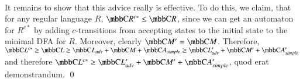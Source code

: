 \paragraph{}
It remains to show that this advice really is effective. To do this, we claim, that for any regular language $R$, $\C{R^{c*}} \leq \C{R}$, since we can get an automaton for $R^{c*}$ by adding $c$-transitions from accepting states to the initial state to the minimal DFA for $R$. Moreover, clearly $\C{M'} = \C{M}$. Therefore, $\C{L^{c*}} \geq \C{L} \geq \C{L_{adv}} + \C{M} + \C{A_{simple}} \geq \C{L'_{adv}} + \C{M'} + \C{A'_{simple}}$ and therefore $\C{L^{c*}} \geq \C{L'_{adv}} + \C{M'} + \C{A'_{simple}}$, quod erat demonstrandum. \qed
